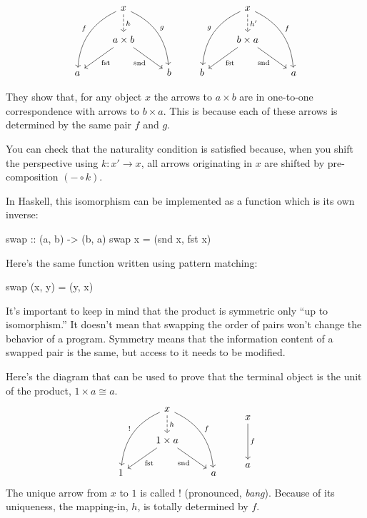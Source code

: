 \documentclass[DaoFP]{subfiles}
\begin{document}
\[
 \begin{tikzcd}
 &x
 \arrow[d, dashed, "h"]
 \arrow[ddl, bend right, "f"']
 \arrow[ddr, bend left, "g"]
 \\
 & a \times b
  \arrow[dl,  "\text{fst}"]
 \arrow[dr,   "\text{snd}"']
 \\
a && b
 \end{tikzcd}
 \qquad
 \begin{tikzcd}
 &x
 \arrow[d, dashed, "h'"]
 \arrow[ddl, bend right, "g"']
 \arrow[ddr, bend left, "f"]
 \\
 & b \times a
  \arrow[dl,  "\text{fst}"]
 \arrow[dr,   "\text{snd}"']
\\
b && a
  \end{tikzcd}
\]

They show that, for any object $x$ the arrows to $a \times b$ are in one-to-one correspondence with arrows to $b \times a$. This is because each of these arrows is determined by the same pair $f$ and $g$. 

You can check that the naturality condition is satisfied because, when you shift the perspective using $k \colon x' \to x$, all arrows originating in $x$ are shifted by pre-composition $(- \circ k)$.

In Haskell, this isomorphism can be implemented as a function which is its own inverse:
\begin{haskell}
swap :: (a, b) -> (b, a)
swap x = (snd x, fst x)
\end{haskell}
Here's the same function written using pattern matching:
\begin{haskell}
swap (x, y) = (y, x)
\end{haskell}

It's important to keep in mind that the product is symmetric only ``up to isomorphism.'' It doesn't mean that swapping the order of pairs won't change the behavior of a program. Symmetry means that the information content of a swapped pair is the same, but access to it needs to be modified.

Here's the diagram that can be used to prove that the terminal object is the unit of the product, $1 \times a \cong a$.
\[
 \begin{tikzcd}
 &x
 \arrow[d, dashed, "h"]
 \arrow[ddl, bend right, "!"']
 \arrow[ddr, bend left, "f"]
 \\
 & 1 \times a
  \arrow[dl,  "\text{fst}"]
 \arrow[dr,   "\text{snd}"']
 \\
1 && a
 \end{tikzcd}
 \qquad
 \begin{tikzcd}
 x
 \arrow[dd, "f"]
\\
\\
a
  \end{tikzcd}
\]
The unique arrow from $x$ to $1$ is called \index{!}$!$ (pronounced, \emph{bang}). Because of its uniqueness, the mapping-in, $h$, is totally determined by $f$.
\end{document}
